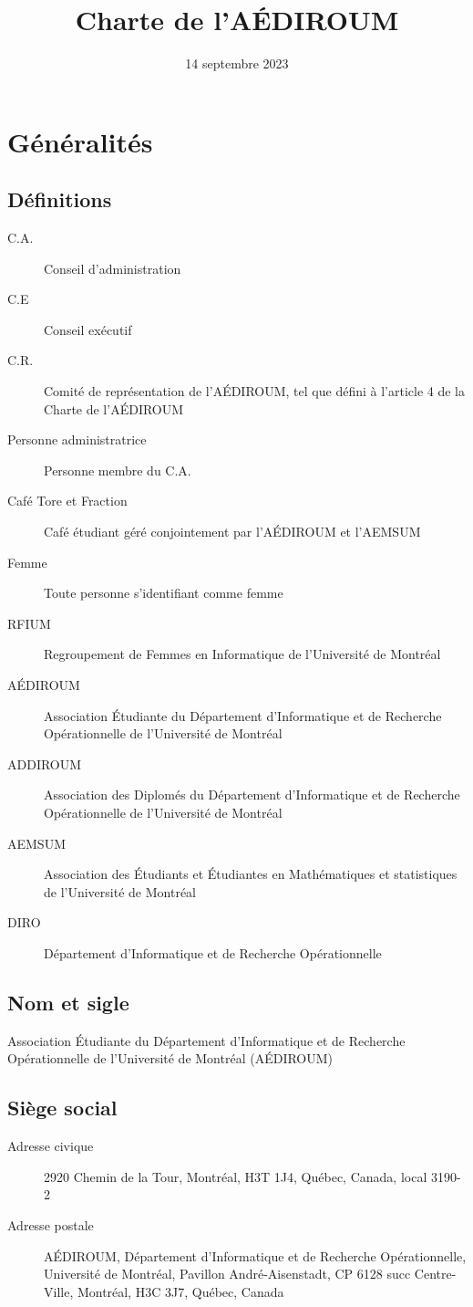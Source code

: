 \documentclass{aediroum}
\title{Charte de l'AÉDIROUM}
\date{14 septembre 2023}
\begin{document}
\maketitle

\section{Généralités}\label{sec:generalites}

\subsection{Définitions}\label{sec:definitions}
\begin{description}
    \item[C.A.] Conseil d’administration
    \item[C.E] Conseil exécutif
    \item[C.R.] Comité de représentation de l’AÉDIROUM, tel que défini à l’article 4 de la Charte de l’AÉDIROUM
    \item[Personne administratrice] Personne membre du C.A.
    \item[Café Tore et Fraction] Café étudiant géré conjointement par l’AÉDIROUM et l’AEMSUM
    \item[Femme] Toute personne s'identifiant comme femme
    \item[RFIUM] Regroupement de Femmes en Informatique de l'Université de Montréal
    \item[AÉDIROUM] Association Étudiante du Département d'Informatique et de Recherche Opérationnelle de l'Université de Montréal
    \item[ADDIROUM] Association des Diplomés du Département d'Informatique et de Recherche Opérationnelle de l'Université de Montréal
    \item[AEMSUM] Association des Étudiants et Étudiantes en Mathématiques et statistiques de l'Université de Montréal
    \item[DIRO] Département d'Informatique et de Recherche Opérationnelle
\end{description}


\subsection{Nom et sigle}\label{sec:nom-et-sigle}
Association Étudiante du Département d'Informatique et de Recherche Opérationnelle de l'Université de Montréal (AÉDIROUM)

\subsection{Siège social}\label{sec:siege-social}
  \begin{description}
  \item[Adresse civique] 2920 Chemin de la Tour, Montréal, H3T 1J4, Québec, Canada, local 3190-2
  \item[Adresse postale] AÉDIROUM, Département d'Informatique et de Recherche Opérationnelle, Université de Montréal, Pavillon André-Aisenstadt, CP 6128 succ Centre-Ville, Montréal, H3C 3J7, Québec, Canada
  \end{description}
\end{document}
